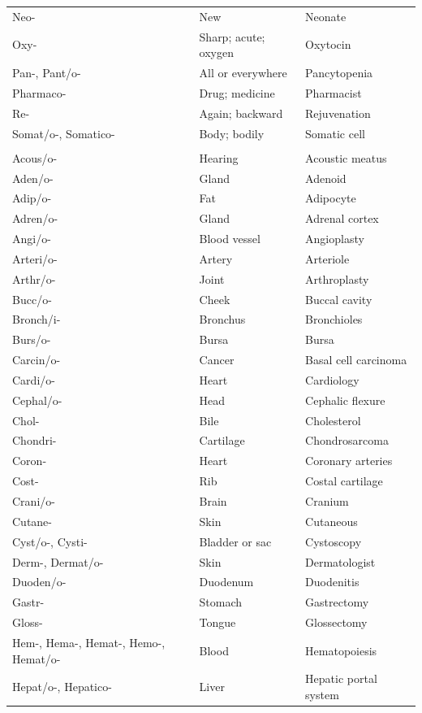 \begin{longtable}{>{\raggedright\arraybackslash}p{} >{\raggedright\arraybackslash}p{} >{\raggedright\arraybackslash}p{}}
Neo- & New & Neonate \\
Oxy- & Sharp; acute; oxygen & Oxytocin \\
Pan-, Pant/o- & All or everywhere & Pancytopenia \\
Pharmaco- & Drug; medicine & Pharmacist \\
Re- & Again; backward & Rejuvenation \\
Somat/o-, Somatico- & Body; bodily & Somatic cell \\
\midrule
\multicolumn{3}{l}{\textbf{Body-part prefixes}} \\
Acous/o- & Hearing & Acoustic meatus \\
Aden/o- & Gland & Adenoid \\
Adip/o- & Fat & Adipocyte \\
Adren/o- & Gland & Adrenal cortex \\
Angi/o- & Blood vessel & Angioplasty \\
Arteri/o- & Artery & Arteriole \\
Arthr/o- & Joint & Arthroplasty \\
Bucc/o- & Cheek & Buccal cavity \\
Bronch/i- & Bronchus & Bronchioles \\
Burs/o- & Bursa & Bursa \\
Carcin/o- & Cancer & Basal cell carcinoma \\
Cardi/o- & Heart & Cardiology \\
Cephal/o- & Head & Cephalic flexure \\
Chol- & Bile & Cholesterol \\
Chondri- & Cartilage & Chondrosarcoma \\
Coron- & Heart & Coronary arteries \\
Cost- & Rib & Costal cartilage \\
Crani/o- & Brain & Cranium \\
Cutane- & Skin & Cutaneous \\
Cyst/o-, Cysti- & Bladder or sac & Cystoscopy \\
Derm-, Dermat/o- & Skin & Dermatologist \\
Duoden/o- & Duodenum & Duodenitis \\
Gastr- & Stomach & Gastrectomy \\
Gloss- & Tongue & Glossectomy \\
Hem-, Hema-, Hemat-, Hemo-, Hemat/o- & Blood & Hematopoiesis \\
Hepat/o-, Hepatico- & Liver & Hepatic portal system \\

\end{longtable}

